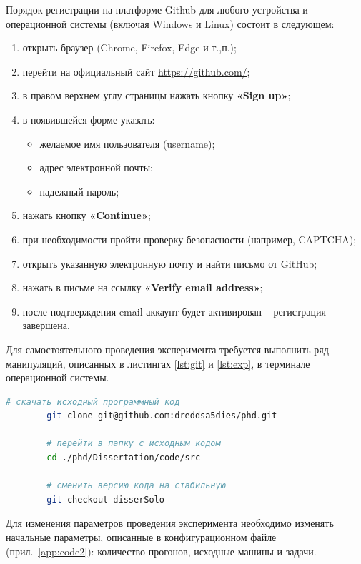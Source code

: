 Порядок регистрации на платформе Github для любого устройства и операционной системы (включая Windows и Linux) состоит в следующем:
	\begin{enumerate}[beginpenalty=10000, midpenalty=10000, wide=\parindent, leftmargin=0pt]
		\item открыть браузер (Chrome, Firefox, Edge и т.,п.);
		\item перейти на официальный сайт \url{https://github.com/};
		\item в правом верхнем углу страницы нажать кнопку \textbf{«Sign up»};
		\item в появившейся форме указать:
		\begin{itemize}[beginpenalty=10000, midpenalty=10000, wide=\parindent, leftmargin=0pt]
			\item желаемое имя пользователя (username);
			\item адрес электронной почты;
			\item надежный пароль;
		\end{itemize}
		\item нажать кнопку \textbf{«Continue»};
		\item при необходимости пройти проверку безопасности (например, CAPTCHA);
		\item открыть указанную электронную почту и найти письмо от GitHub;
		\item нажать в письме на ссылку \textbf{«Verify email address»};
		\item после подтверждения email аккаунт будет активирован -- регистрация завершена.
	\end{enumerate}

Для самостоятельного проведения эксперимента требуется выполнить ряд манипуляций, описанных в листингах \ref{lst:git} и \ref{lst:exp}, в терминале операционной системы.

\begin{ListingEnv}[ht]
	\captiondelim{ }
	\caption{Порядок команд для запуска эксперимента}\label{lst:git}
	\begin{lstlisting}[language=Bash]
		# скачать исходный программный код
		git clone git@github.com:dreddsa5dies/phd.git

		# перейти в папку с исходным кодом
		cd ./phd/Dissertation/code/src

		# сменить версию кода на стабильную
		git checkout disserSolo
	\end{lstlisting}
\end{ListingEnv}

Для изменения параметров проведения эксперимента необходимо изменять начальные параметры, описанные в конфигурационном файле (прил.~\ref{app:code2}): количество прогонов, исходные машины и задачи.


